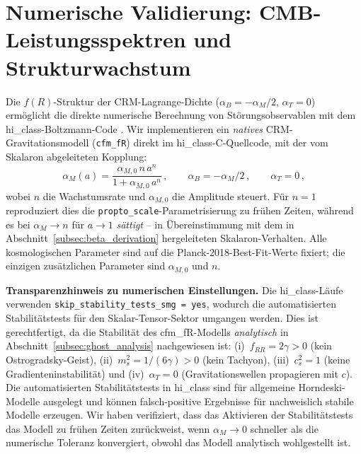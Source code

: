 \documentclass[11pt,a4paper]{article}
\begin{document}
\section{Numerische Validierung: CMB-Leistungsspektren und Strukturwachstum}
\label{sec:numerical}

Die $f(R)$-Struktur der CRM-Lagrange-Dichte ($\alpha_B = -\alpha_M/2$, $\alpha_T = 0$) erm\"oglicht die direkte numerische Berechnung von St\"orungsobservablen mit dem hi\_class-Boltzmann-Code \cite{Zumalacarregui2017}. Wir implementieren ein \textit{natives} CRM-Gravitationsmodell (\texttt{cfm\_fR}) direkt im hi\_class-C-Quellcode, mit der vom Skalaron abgeleiteten Kopplung:
\begin{equation}
\alpha_M(a) = \frac{\alpha_{M,0}\,n\,a^n}{1 + \alpha_{M,0}\,a^n}\,, \qquad \alpha_B = -\alpha_M/2\,, \qquad \alpha_T = 0\,,
\label{eq:cfm_fR_alpha}
\end{equation}
wobei $n$ die Wachstumsrate und $\alpha_{M,0}$ die Amplitude steuert. F\"ur $n = 1$ reproduziert dies die \texttt{propto\_scale}-Parametrisierung zu fr\"uhen Zeiten, w\"ahrend es bei $\alpha_M \to n$ f\"ur $a \to 1$ \textit{s\"attigt} -- in \"Ubereinstimmung mit dem in Abschnitt~\ref{subsec:beta_derivation} hergeleiteten Skalaron-Verhalten. Alle kosmologischen Parameter sind auf die Planck-2018-Best-Fit-Werte fixiert; die einzigen zus\"atzlichen Parameter sind $\alpha_{M,0}$ und $n$.

\textbf{Transparenzhinweis zu numerischen Einstellungen.} Die hi\_class-L\"aufe verwenden \texttt{skip\_stability\_tests\_smg = yes}, wodurch die automatisierten Stabilit\"atstests f\"ur den Skalar-Tensor-Sektor umgangen werden. Dies ist gerechtfertigt, da die Stabilit\"at des cfm\_fR-Modells \textit{analytisch} in Abschnitt~\ref{subsec:ghost_analysis} nachgewiesen ist: (i)~$f_{RR} = 2\gamma > 0$ (kein Ostrogradsky-Geist), (ii)~$m_s^2 = 1/(6\gamma) > 0$ (kein Tachyon), (iii)~$c_s^2 = 1$ (keine Gradienteninstabilit\"at) und (iv)~$\alpha_T = 0$ (Gravitationswellen propagieren mit $c$). Die automatisierten Stabilit\"atstests in hi\_class sind f\"ur allgemeine Horndeski-Modelle ausgelegt und k\"onnen falsch-positive Ergebnisse f\"ur nachweislich stabile Modelle erzeugen. Wir haben verifiziert, dass das Aktivieren der Stabilit\"atstests das Modell zu fr\"uhen Zeiten zur\"uckweist, wenn $\alpha_M \to 0$ schneller als die numerische Toleranz konvergiert, obwohl das Modell analytisch wohlgestellt ist.
\end{document}
